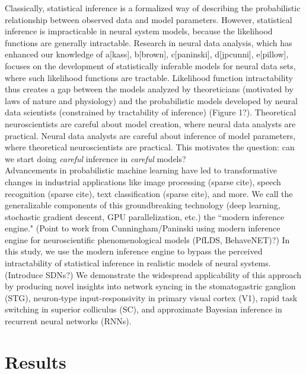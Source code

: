 \documentclass[11pt]{article}
\begin{document}
Classically, statistical inference is a formalized way of describing the probabilistic relationship between observed data and model parameters.  However, statistical inference is impracticable in neural system models, because the likelihood functions are generally intractable.  Research in neural data analysis, which has enhanced our knowledge of a[kass], b[brown], c[paninski], d[jpcunni], e[pillow], focuses on the development of statistically inferable models for neural data sets, where such likelihood functions are tractable. Likelihood function intractability thus creates a gap between the models analyzed by theoreticians (motivated by laws of nature and physiology) and the probabilistic models developed by neural data scientists (constrained by tractability of inference) (Figure 1?).   Theoretical neuroscientists are careful about model creation, where neural data analysts are practical.  Neural data analysts are careful about inference of model parameters, where theoretical neuroscientists are practical.  This motivates the question: can we start doing \emph{careful} inference in \emph{careful} models? \\

Advancements in probabilistic machine learning have led to transformative changes in industrial applications like image processing (sparse cite), speech recognition (sparse cite), text classification (sparse cite), and more.  We call the generalizable components of this groundbreaking technology (deep learning, stochastic gradient descent, GPU parallelization, etc.) the ``modern inference engine." (Point to work from Cunningham/Paninski using modern inference engine for neuroscientific phenomenological models (PfLDS, BehaveNET)?) In this study, we use the modern inference engine to bypass the perceived intractability of statistical inference in realistic models of neural systems.  (Introduce SDNs?)  We demonstrate the widespread applicability of this approach by producing novel insights into network syncing in the stomatogastric ganglion (STG), neuron-type input-responsivity in primary visual cortex (V1), rapid task switching in superior colliculus (SC), and approximate Bayesian inference in recurrent neural networks (RNNs). \\

\section{Results}
\end{document}
